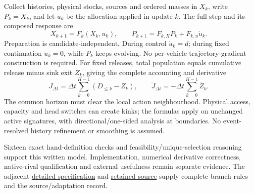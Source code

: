 \documentclass[10pt,a4paper]{article}
\begin{document}
Collect histories, physical stocks, sources and ordered masses in $X_k$,
write $P_k=\dot X_k$, and let $u_k$ be the allocation applied in update $k$.
The full step and its composed response are
\begin{equation}
 X_{k+1}=F_k(X_k,u_k),\qquad
 P_{k+1}=F_{k,X}P_k+F_{k,u}\dot u_k .
 \label{eq:compact-chain}
\end{equation}
Preparation is candidate-independent. During control $\dot u_k=d$;
during fixed continuation $\dot u_k=0$, while $P_k$ keeps evolving.
No per-vehicle trajectory-gradient construction is required.
For fixed releases, total population equals cumulative release minus
sink exit $Z_k$, giving the complete accounting and derivative
\begin{equation}
 J_{\Delta t}=\Delta t\sum_{k=0}^{H-1}(D_{\leq k}-Z_k),
 \qquad
 \dot J_{\Delta t}=-\Delta t\sum_{k=0}^{H-1}\dot Z_k .
 \label{eq:compact-objective-derivative}
\end{equation}
The common horizon must clear the local action neighbourhood.
Physical access, capacity and head switches can create kinks; the formulas
apply on unchanged active signatures, with directional/one-sided analysis
at boundaries. No event-resolved history refinement or smoothing is assumed.

Sixteen exact hand-definition checks and feasibility/unique-selection
reasoning support this written model. Implementation, numerical derivative
correctness, native-rival qualification and external usefulness remain
separate evidence. The adjacent
\href{urban_methodology_specification.pdf}{detailed specification}
and \href{urban_methodology_specification.tex}{retained source}
supply complete branch rules and the source/adaptation record.
\end{document}
